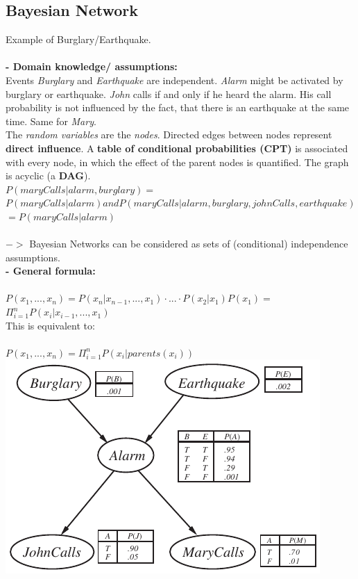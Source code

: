 \documentclass{article}
\begin{document}
\subsection{Bayesian Network}
Example of Burglary/Earthquake.\\\\
\textbf{- Domain knowledge/ assumptions:}\\
Events \textit{Burglary} and \textit{Earthquake} are independent. \textit{Alarm} might be activated by burglary or earthquake. \textit{John} calls if and only if he heard the alarm. His call probability is not
influenced by the fact, that there is an earthquake at the same time. Same for \textit{Mary}.\\
The \textit{random variables} are the \textit{nodes}. Directed edges between nodes represent \textbf{direct influence}. A \textbf{table of conditional probabilities (CPT) }is associated with every node, in which the effect of the parent nodes is quantified. The graph is acyclic (a \textbf{DAG}).\\
$P (maryCalls | alarm, burglary) = $\\
$P (maryCalls | alarm) and P (maryCalls | alarm, burglary, johnCalls, earthquake) $\\
$= P (maryCalls | alarm)$\\\\
$->$ Bayesian Networks can be considered as sets of (conditional) independence assumptions.\\
\textbf{- General formula: }\\\\
$P(x_1,...,x_n ) = P (x_n | x_{n-1},...,x_1 )\cdot ...\cdot P(x_2|x_1)P(x_1) =$\\
$\Pi_{i=1}^n P(x_i|x_{i-1},...,x_1)$\\
This is equivalent to:\\\\
$P(x_1,...,x_n) = \Pi_{i=1}^n P(x_i|parents(x_i))$\\
\includegraphics[scale=0.4]{69.png}\\
\end{document}
